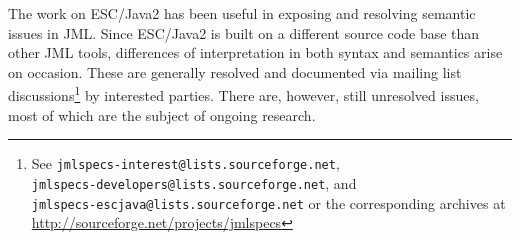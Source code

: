 \documentclass{llncs}
\begin{document}
The work on ESC/Java2 has been useful in exposing and resolving
semantic issues in JML.  Since ESC/Java2 is built on a different
source code base than other JML tools, differences of interpretation
in both syntax and semantics arise on occasion.  These are generally
resolved and documented via mailing list discussions\footnote{See
  \texttt{jmlspecs-interest@lists.sourceforge.net},\\
  \texttt{jmlspecs-developers@lists.sourceforge.net}, and \\
  \texttt{jmlspecs-escjava@lists.sourceforge.net} or the corresponding
  archives at \url{http://sourceforge.net/projects/jmlspecs}} by
interested parties.  There are, however, still unresolved issues, most
of which are the subject of ongoing research.
\setlength{\partopsep}{0in}\setlength{\parskip}{0in}\setlength{\itemsep}{0in}\setlength{\topsep}{0in}
\end{document}

